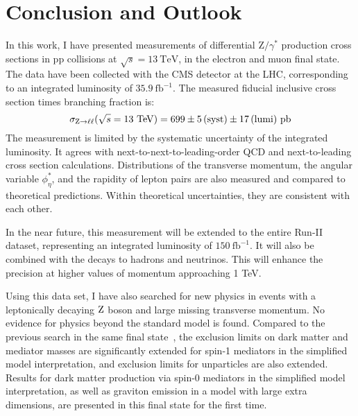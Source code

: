 \chapter{Conclusion and Outlook}

In this work, I have presented measurements of differential $\mathrm{Z}/\gamma^{*}$ production cross sections in $\mathrm{p}\mathrm{p}$ collisions at $\sqrt{s}=13~\mathrm{TeV}$,
in the electron and muon final state.
The data have been collected with the CMS detector at the LHC, corresponding to an integrated luminosity of $35.9~\mathrm{fb}^{-1}$.
The measured fiducial inclusive cross section times branching fraction is: 
\begin{equation*}
\sigma_{\mathrm{Z} \to \ell\ell}(\sqrt{s}=13~\mathrm{TeV}) = 699\pm5\,\text{(syst)}\pm17\,\text{(lumi)}~\mathrm{pb}
\end{equation*}
The measurement is limited by the systematic uncertainty of the integrated luminosity.
It agrees with next-to-next-to-leading-order QCD and next-to-leading cross section calculations. 
Distributions of the transverse momentum, the angular variable $\phi^{*}_\eta$, and the rapidity of lepton pairs are also measured and compared to theoretical predictions.
Within theoretical uncertainties, they are consistent with each other.

In the near future, this measurement will be extended to the entire Run-II dataset,
representing an integrated luminosity of $150~\mathrm{fb}^{-1}$.
It will also be combined with the decays to hadrons and neutrinos.
This will enhance the precision at higher values of momentum approaching 1 TeV.

Using this data set, I have also searched for new physics in events with a
leptonically decaying $\mathrm{Z}$ boson and large missing transverse momentum.
No evidence for physics beyond the standard model is found.
Compared to the previous search in the same final state~\cite{CMS-PAPER-EXO-16-010},
the exclusion limits on dark matter and mediator masses are significantly extended for spin-1 mediators in the simplified model interpretation, and exclusion limits for unparticles are also extended.
Results for dark matter production via spin-0 mediators in the simplified model interpretation,
as well as graviton emission in a model with large extra dimensions,
are presented in this final state for the first time.

